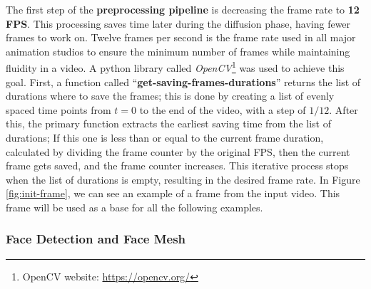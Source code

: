 \documentclass[preprint]{elsarticle}
\begin{document}
The first step of the \textbf{preprocessing pipeline} is decreasing the frame rate to \textbf{12 FPS}. 
This processing saves time later during the diffusion phase, having fewer frames to work on. 
Twelve frames per second is the frame rate used in all major animation studios to ensure the minimum number of 
frames while maintaining fluidity in a video. A python library called \emph{OpenCV}\footnote{OpenCV website: \url{https://opencv.org/}} 
was used to achieve this goal. 
First, a function called ``\textbf{get-saving-frames-durations}'' returns the list of durations where to save the frames; 
this is done by creating a list of evenly spaced time points from $t=0$ to the end of the video, with a step of $1/12$. 
After this, the primary function extracts the earliest saving time from the list of durations; 
If this one is less than or equal to the current frame duration, calculated by dividing the frame counter by the original FPS, 
then the current frame gets saved, and the frame counter increases. This iterative process stops when the list of durations is empty, 
resulting in the desired frame rate. In Figure \ref{fig:init-frame}, we can see an example of a frame from the input video.
This frame will be used as a base for all the following examples.




\subsubsection{Face Detection and Face Mesh} \label{sec:face_detection}
\end{document}
